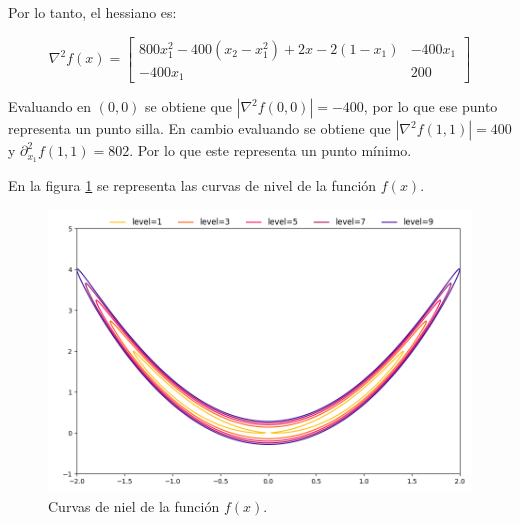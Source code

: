 Por lo tanto, el hessiano es:

\begin{equation*}
    \nabla^2f(x) = \begin{bmatrix}
        800x_1^2 -400(x_2-x_1^2)+2x-2(1-x_1) & -400x_1 \\
        -400x_1                              & 200
    \end{bmatrix}
\end{equation*}

Evaluando en $(0,0)$ se obtiene que $|\nabla^2 f(0,0)|=-400$, por lo que ese punto representa un punto silla. En cambio evaluando se obtiene que $|\nabla^2 f(1,1)|=400$ y $\partial^2_{x_1}f(1,1)=802$. Por lo que este representa un punto mínimo.

En la figura \ref{fig:problem_6} se representa las curvas de nivel de la función $f(x)$.

\begin{figure}[H]
    \centering
    \includegraphics[width=12cm]{Graphics/problem06.png}
    \caption{Curvas de niel de la función $f(x)$.}
    \label{fig:problem_6}
\end{figure}